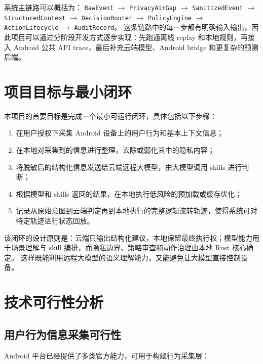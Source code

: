 \documentclass[12pt,a4paper]{article}
\begin{document}
系统主链路可以概括为：
\texttt{RawEvent} $\rightarrow$ \texttt{PrivacyAirGap} $\rightarrow$ \texttt{SanitizedEvent} $\rightarrow$
\texttt{StructuredContext} $\rightarrow$ \texttt{DecisionRouter} $\rightarrow$ \texttt{PolicyEngine} $\rightarrow$
\texttt{ActionLifecycle} $\rightarrow$ \texttt{AuditRecord}。
这条链路中的每一步都有明确输入输出，因此项目可以通过分阶段开发方式逐步实现：先跑通离线 replay 和本地规则，再接入 Android 公共 API trace，最后补充云端模型、Android bridge 和更复杂的预测后端。

\section{项目目标与最小闭环}\label{sec:goals}

本项目的首要目标是完成一个最小可运行闭环，具体包括以下步骤：

\begin{enumerate}[label=(\arabic*)]
  \item 在用户授权下采集 Android 设备上的用户行为和基本上下文信息；
  \item 在本地对采集到的信息进行整理，去除或弱化其中的隐私内容；
  \item 将脱敏后的结构化信息发送给云端远程大模型，由大模型调用 skills 进行判断；
  \item 根据模型和 skills 返回的结果，在本地执行低风险的预加载或缓存优化；
  \item 记录从原始意图到云端判定再到本地执行的完整逻辑流转轨迹，使得系统可对特定轨迹进行状态回放。
\end{enumerate}

该闭环的设计原则是：云端只输出结构化建议，本地保留最终执行权；模型能力用于场景理解与 skill 编排，而隐私边界、策略审查和动作治理由本地 Rust 核心确定。
这样既能利用远程大模型的语义理解能力，又能避免让大模型直接控制设备。

\section{技术可行性分析}\label{sec:technical}

\subsection{用户行为信息采集可行性}\label{subsec:behavior-collection}

Android 平台已经提供了多类官方能力，可用于构建行为采集层：
\end{document}

